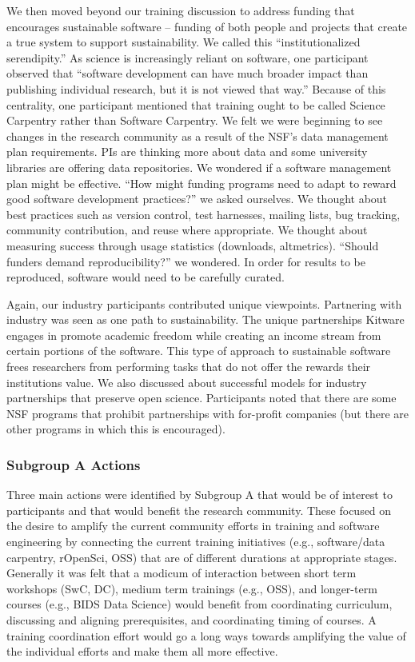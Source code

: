 \documentclass[11pt, oneside]{amsart}
\begin{document}
We then moved beyond our training discussion to address funding that encourages
sustainable software -- funding of both people and projects that create a true
system to support sustainability. We called this ``institutionalized
serendipity.'' As science is increasingly reliant on software, one participant
observed that ``software development can have much broader impact than
publishing individual research, but it is not viewed that way.'' Because of this
centrality, one participant mentioned that training ought to be called Science
Carpentry rather than Software Carpentry. We felt we were beginning to see
changes in the research community as a result of the NSF's data management plan
requirements. PIs are thinking more about data and some university libraries are
offering data repositories. We wondered if a software management plan might be
effective. ``How might funding programs need to adapt to reward good software
development practices?'' we asked ourselves. We thought about best practices
such as version control, test harnesses, mailing lists, bug tracking, community
contribution, and reuse where appropriate. We thought about measuring success
through usage statistics (downloads, altmetrics). ``Should funders demand
reproducibility?'' we wondered. In order for results to be reproduced, software
would need to be carefully curated.

Again, our industry participants contributed unique viewpoints. Partnering with
industry was seen as one path to sustainability. The unique partnerships Kitware
engages in promote academic freedom while creating an income stream from certain
portions of the software. This type of approach to sustainable software frees
researchers from performing tasks that do not offer the rewards their
institutions value. We also discussed about successful models for industry
partnerships that preserve open science. Participants noted that there are some
NSF programs that prohibit partnerships with for-profit companies (but there are
other programs in which this is encouraged).


\subsubsection{Subgroup A Actions}

Three main actions were identified by Subgroup A that would be of interest to
participants and that would benefit the research community. These focused on the
desire to amplify the current community efforts in training and software
engineering by connecting the current training initiatives (e.g., software/data
carpentry, rOpenSci, OSS) that are of different durations at appropriate stages.
Generally it was felt that a modicum of interaction between short term workshops
(SwC, DC), medium term trainings (e.g., OSS), and longer-term courses (e.g.,
BIDS Data Science) would benefit from coordinating curriculum, discussing and
aligning prerequisites, and coordinating timing of courses. A training
coordination effort would go a long ways towards amplifying the value of the
individual efforts and make them all more effective.
\end{document}
